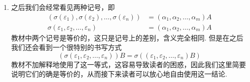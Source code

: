 \begin{enumerate}
    \item 之后我们会经常看见两种记号，即
          \begin{align*}
              (\sigma(\varepsilon_1),\sigma(\varepsilon_2),\ldots,\sigma(\varepsilon_n))
              & =(\alpha_1,\alpha_2,\ldots,\alpha_m)A \\
              \sigma(\varepsilon_1,\varepsilon_2,\ldots,\varepsilon_n)
              & =(\alpha_1,\alpha_2,\ldots,\alpha_m)A
          \end{align*}
          教材中两个记号是等价的，这只是记号上的差别，含义完全相同. 但是在之后我们还会看到一个很特别的书写方式
          \[
            (\sigma(\varepsilon_1,\varepsilon_2,\ldots,\varepsilon_n))B
            =\sigma((\varepsilon_1,\varepsilon_2,\ldots,\varepsilon_n)B)
          \]
          教材不加解释地使用了这一等式，这容易导致读者的困惑，因此我们这里简要说明它们的确是等价的，从而接下来读者可以放心地自由使用这一结论.


\end{enumerate}
